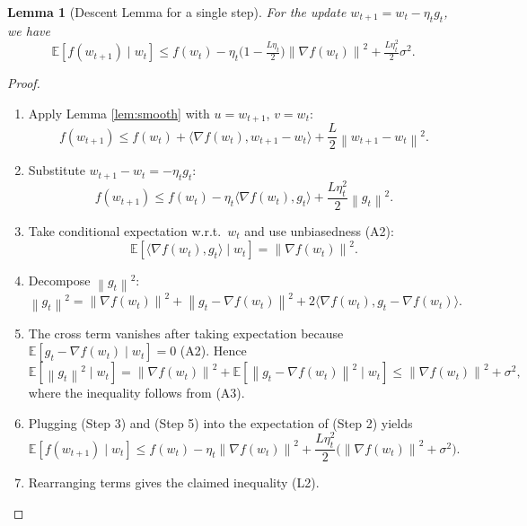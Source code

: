 \documentclass{article}
\newtheorem{lemma}{Lemma}
\newcommand{\EE}{\mathbb{E}}
\newcommand{\norm}[1]{\left\|#1\right\|}
\begin{document}
\begin{lemma}[Descent Lemma for a single step]\label{lem:descent}
For the update $w_{t+1}=w_t-\eta_t g_t$, we have
\[
\EE\!\left[f(w_{t+1})\mid w_t\right]
\le f(w_t)-\eta_t\bigl(1-\tfrac{L\eta_t}{2}\bigr)\norm{\nabla f(w_t)}^2
+\tfrac{L\eta_t^2}{2}\sigma^2 .
\tag{L2}
\]
\end{lemma}
\begin{proof}
\begin{enumerate}
\item Apply Lemma \ref{lem:smooth} with $u=w_{t+1}$, $v=w_t$:
\[
f(w_{t+1})\le f(w_t)+\langle\nabla f(w_t),w_{t+1}-w_t\rangle
+\frac{L}{2}\norm{w_{t+1}-w_t}^2 .
\tag{Step 1}
\]
\item Substitute $w_{t+1}-w_t=-\eta_t g_t$:
\[
f(w_{t+1})\le f(w_t)-\eta_t\langle\nabla f(w_t),g_t\rangle
+\frac{L\eta_t^2}{2}\norm{g_t}^2 .
\tag{Step 2}
\]
\item Take conditional expectation w.r.t.\ $w_t$ and use unbiasedness (A2):
\[
\EE\!\left[\langle\nabla f(w_t),g_t\rangle\mid w_t\right]
= \norm{\nabla f(w_t)}^2 .
\tag{Step 3}
\]
\item Decompose $\norm{g_t}^2$:
\[
\norm{g_t}^2
= \norm{\nabla f(w_t)}^2
+ \norm{g_t-\nabla f(w_t)}^2
+2\langle\nabla f(w_t),g_t-\nabla f(w_t)\rangle .
\tag{Step 4}
\]
\item The cross term vanishes after taking expectation because
$\EE[g_t-\nabla f(w_t)\mid w_t]=0$ (A2). Hence
\[
\EE\!\left[\norm{g_t}^2\mid w_t\right]
= \norm{\nabla f(w_t)}^2+\EE\!\left[\norm{g_t-\nabla f(w_t)}^2\mid w_t\right]
\le \norm{\nabla f(w_t)}^2+\sigma^2 ,
\tag{Step 5}
\]
where the inequality follows from (A3).
\item Plugging (Step 3) and (Step 5) into the expectation of (Step 2) yields
\[
\EE\!\left[f(w_{t+1})\mid w_t\right]
\le f(w_t)-\eta_t\norm{\nabla f(w_t)}^2
+\frac{L\eta_t^2}{2}\bigl(\norm{\nabla f(w_t)}^2+\sigma^2\bigr) .
\tag{Step 6}
\]
\item Rearranging terms gives the claimed inequality (L2). \qedhere
\end{enumerate}
\end{proof}

\newpage
\end{document}
